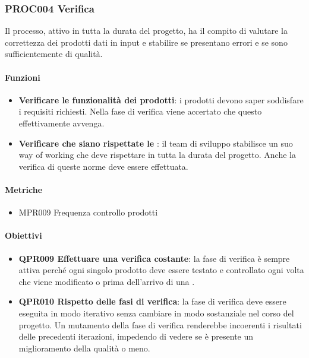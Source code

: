 	\subsubsection{PROC004 Verifica}
	Il processo, attivo in tutta la durata del progetto, ha il compito di valutare la correttezza dei prodotti dati in input e stabilire se presentano errori
	e se sono sufficientemente di qualità.
	
		\paragraph*{Funzioni}
		
		\begin{itemize}
			\item \textbf{Verificare le funzionalità dei prodotti}: i prodotti devono saper soddisfare i requisiti richiesti. Nella fase di verifica viene accertato che questo effettivamente avvenga.
			\item \textbf{Verificare che siano rispettate le \NdP}: il team di sviluppo stabilisce un suo way of working che deve rispettare in tutta la durata del progetto. Anche la verifica di queste norme deve essere effettuata.
		\end{itemize}
		
		\paragraph*{Metriche}
		
		\begin{itemize}
			\item MPR009 Frequenza controllo prodotti
		\end{itemize}
		
		\paragraph*{Obiettivi}
		
		\begin{itemize}
			\item \textbf{QPR009 Effettuare una verifica costante}: la fase di verifica è sempre attiva perché ogni singolo prodotto deve essere testato e controllato ogni volta che viene modificato o prima dell'arrivo di una .
			\item \textbf{QPR010 Rispetto delle fasi di verifica}: la fase di verifica deve essere eseguita in modo iterativo senza cambiare in modo sostanziale nel corso del progetto. Un mutamento della fase di verifica renderebbe incoerenti i risultati delle precedenti iterazioni, impedendo di vedere se è presente un miglioramento della qualità o meno.
		\end{itemize}


